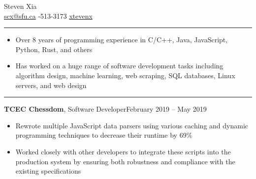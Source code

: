 \documentclass{article}
\newcommand{\entrytitle}[3]{\vspace{0.5em}\textbf{#1}, {\small #2}\hfill #3}
\renewcommand{\section}[1]{\vspace{1em}{\Large #1}\vspace{0.3em}\hrule}
\newenvironment{entrybody}{\begin{itemize}[itemsep=0.3em]}{\end{itemize}}
\begin{document}
\selectfont
\pagestyle{empty}


\begin{center}
    {\huge Steven Xia} \\\vspace{1em}
    \faEnvelope\: \href{mailto:scx@sfu.ca}{scx@sfu.ca} \qquad
    \faPhoneSquare*{}-513-3173 \qquad
    \faGithub\: \href{https://github.com/xtevenx}{xtevenx}
\end{center}\vspace{-1em}


\section{Skills} \vspace{0.5em}

\begin{entrybody}
\item Over 8 years of programming experience in C/C++, Java, JavaScript, Python, Rust, and others
\item
    Has worked on a huge range of software development tasks including algorithm design, machine
    learning, web scraping, SQL databases, Linux servers, and web design
\end{entrybody}


\section{Experience}


\entrytitle{TCEC Chessdom}{Software Developer}{February 2019 – May 2019}
\begin{entrybody}
\item
    Rewrote multiple JavaScript data parsers using various caching and dynamic programming
    techniques to decrease their runtime by 69\%
\item
    Worked closely with other developers to integrate these scripts into the production system by
    ensuring both robustness and compliance with the existing specifications
\end{entrybody}
\end{document}
